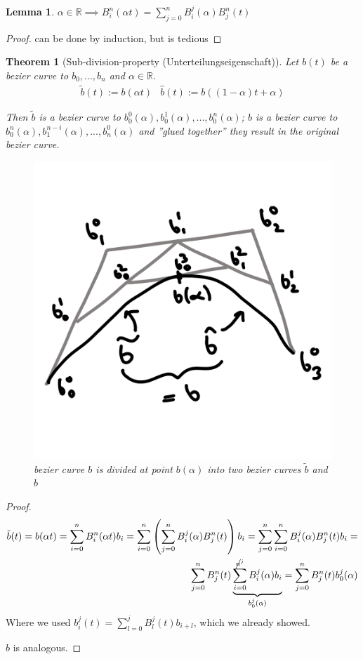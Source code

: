 \documentclass[]{article}
\newtheorem{lemma}{Lemma}
\newtheorem{theorem}{Theorem}
\begin{document}
\begin{lemma}
	$\alpha \in \mathbb{R} \implies B_i^n(\alpha t) = \sum_{j=0}^{n} B_i^j(\alpha) B_j^n(t)$
\end{lemma}

\begin{proof}
	can be done by induction, but is tedious
\end{proof}

\begin{theorem}[Sub-division-property (Unterteilungseigenschaft)]
	Let $b(t)$ be a bezier curve to $b_0, ..., b_n$ and $\alpha \in \mathbb{R}$.
	\begin{align*}
		\tilde{b}(t) := b(\alpha t) & \hat{b}(t) := b((1-\alpha)t + \alpha)
	\end{align*}
	
	Then $\tilde{b}$ is a bezier curve to $b_0^0(\alpha), b_0^1(\alpha), ..., b_0^n(\alpha)$; $\hat{b}$ is a bezier curve to $b_0^n(\alpha), b_1^{n-i}(\alpha), ..., b_n^0(\alpha)$ and ''glued together'' they result in the original bezier curve.
	
	\begin{figure}[h!]
		\centering
		\includegraphics[width=0.3\linewidth]{figures/sub_division}
		\caption{bezier curve $b$ is divided at point $b(\alpha)$ into two bezier curves $\tilde{b}$ and $\hat{b}$}
		\label{fig:sub_division}
	\end{figure}
\end{theorem}

\begin{proof}
	\begin{align*}
		\tilde{b}(t) = b(\alpha t) = \sum_{i=0}^{n} B_i^n(\alpha t) b_i = \sum_{i=0}^{n} \left(\sum_{j=0}^{n}B_i^j(\alpha) B_j^n(t)\right) b_i = \sum_{j=0}^{n} \sum_{i=0}^{n} B_i^j(\alpha) B_j^n(t) b_i =\\
		\sum_{j=0}^{n} B_j^n(t) \underbrace{\sum_{i=0}^{\cancel{n}^j} B_i^j(\alpha) b_i}_{b_0^j(\alpha)} = \sum_{j=0}^{n} B_j^n(t) b_0^j(\alpha)
	\end{align*}
	Where we used $b_i^j(t) = \sum_{l=0}^{j} B_l^j(t) b_{i+l}$, which we already showed.
	
	$\hat{b}$ is analogous.
\end{proof}
\end{document}
